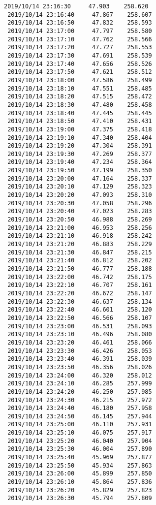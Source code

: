 \documentclass[11pt]{article}
\begin{document}
\begin{Verbatim}[commandchars=\\\{\}]
 2019/10/14 23:16:30     47.903    258.620
 2019/10/14 23:16:40     47.867    258.607
 2019/10/14 23:16:50     47.832    258.593
 2019/10/14 23:17:00     47.797    258.580
 2019/10/14 23:17:10     47.762    258.566
 2019/10/14 23:17:20     47.727    258.553
 2019/10/14 23:17:30     47.691    258.539
 2019/10/14 23:17:40     47.656    258.526
 2019/10/14 23:17:50     47.621    258.512
 2019/10/14 23:18:00     47.586    258.499
 2019/10/14 23:18:10     47.551    258.485
 2019/10/14 23:18:20     47.515    258.472
 2019/10/14 23:18:30     47.480    258.458
 2019/10/14 23:18:40     47.445    258.445
 2019/10/14 23:18:50     47.410    258.431
 2019/10/14 23:19:00     47.375    258.418
 2019/10/14 23:19:10     47.340    258.404
 2019/10/14 23:19:20     47.304    258.391
 2019/10/14 23:19:30     47.269    258.377
 2019/10/14 23:19:40     47.234    258.364
 2019/10/14 23:19:50     47.199    258.350
 2019/10/14 23:20:00     47.164    258.337
 2019/10/14 23:20:10     47.129    258.323
 2019/10/14 23:20:20     47.093    258.310
 2019/10/14 23:20:30     47.058    258.296
 2019/10/14 23:20:40     47.023    258.283
 2019/10/14 23:20:50     46.988    258.269
 2019/10/14 23:21:00     46.953    258.256
 2019/10/14 23:21:10     46.918    258.242
 2019/10/14 23:21:20     46.883    258.229
 2019/10/14 23:21:30     46.847    258.215
 2019/10/14 23:21:40     46.812    258.202
 2019/10/14 23:21:50     46.777    258.188
 2019/10/14 23:22:00     46.742    258.175
 2019/10/14 23:22:10     46.707    258.161
 2019/10/14 23:22:20     46.672    258.147
 2019/10/14 23:22:30     46.637    258.134
 2019/10/14 23:22:40     46.601    258.120
 2019/10/14 23:22:50     46.566    258.107
 2019/10/14 23:23:00     46.531    258.093
 2019/10/14 23:23:10     46.496    258.080
 2019/10/14 23:23:20     46.461    258.066
 2019/10/14 23:23:30     46.426    258.053
 2019/10/14 23:23:40     46.391    258.039
 2019/10/14 23:23:50     46.356    258.026
 2019/10/14 23:24:00     46.320    258.012
 2019/10/14 23:24:10     46.285    257.999
 2019/10/14 23:24:20     46.250    257.985
 2019/10/14 23:24:30     46.215    257.972
 2019/10/14 23:24:40     46.180    257.958
 2019/10/14 23:24:50     46.145    257.944
 2019/10/14 23:25:00     46.110    257.931
 2019/10/14 23:25:10     46.075    257.917
 2019/10/14 23:25:20     46.040    257.904
 2019/10/14 23:25:30     46.004    257.890
 2019/10/14 23:25:40     45.969    257.877
 2019/10/14 23:25:50     45.934    257.863
 2019/10/14 23:26:00     45.899    257.850
 2019/10/14 23:26:10     45.864    257.836
 2019/10/14 23:26:20     45.829    257.823
 2019/10/14 23:26:30     45.794    257.809

\end{Verbatim}
\end{document}
